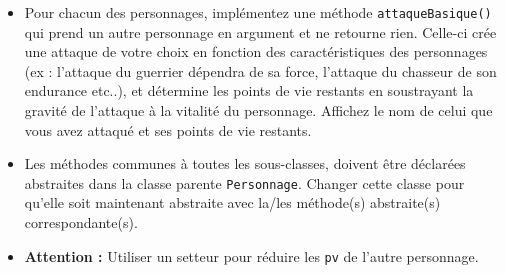 \begin{Exercice}[15 minutes]
\begin{itemize}
    

    \item Pour chacun des personnages, implémentez une méthode \lstinline{attaqueBasique()} qui prend un autre personnage en argument et ne retourne rien. Celle-ci crée une attaque de votre choix en fonction des caractéristiques des personnages (ex : l’attaque du guerrier dépendra de sa force, l’attaque du chasseur de son endurance etc..), et détermine les points de vie restants en soustrayant la gravité de l'attaque à la vitalité du personnage. Affichez le nom de celui que vous avez attaqué et ses points de vie restants.
    \item Les méthodes communes à toutes les sous-classes, doivent être déclarées abstraites dans la classe parente \lstinline{Personnage}. Changer cette classe pour qu'elle soit maintenant abstraite avec la/les méthode(s) abstraite(s) correspondante(s).
    \item \textbf{Attention :} Utiliser un setteur pour réduire les \lstinline{pv} de l’autre personnage.
    
    
\end{itemize}

\begin{solution}
    
\end{solution}
\begin{solution}
    
\end{solution}

\begin{solution}
    
\end{solution}
\begin{solution}
    
\end{solution}
\end{Exercice}


